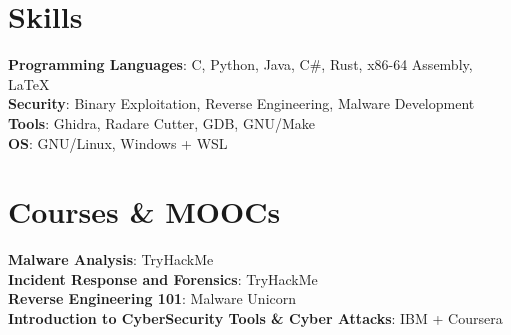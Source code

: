 \documentclass[letterpaper,11pt]{article}
\begin{document}
\section{Skills}
\begin{itemize}[leftmargin=0.15in, label={}]
    \normalsize{\item{
     \textbf{Programming Languages}{: C, Python, Java, C\#, Rust, x86-64 Assembly, LaTeX} \\
     \textbf{Security}{: Binary Exploitation, Reverse Engineering, Malware Development}\\
     \textbf{Tools}{: Ghidra, Radare Cutter, GDB, GNU/Make} \\
     \textbf{OS}{: GNU/Linux, Windows + WSL} \\
    }}
 \end{itemize}

\section{Courses \& MOOCs}
\begin{itemize}[leftmargin=0.15in, label={}]
    \normalsize{\item{
     \textbf{Malware Analysis}{: TryHackMe} \\
     \textbf{Incident Response and Forensics}{: TryHackMe}\\
     \textbf{Reverse Engineering 101}{: Malware Unicorn} \\
     \textbf{Introduction to CyberSecurity Tools \& Cyber Attacks}{: IBM + Coursera} \\
    }}
 \end{itemize}
\end{document}
